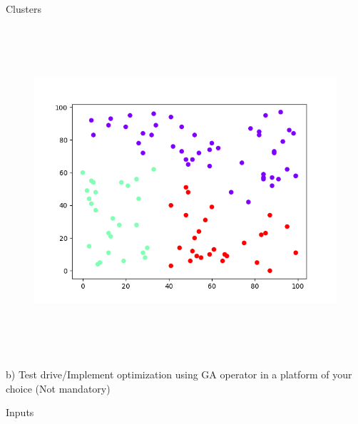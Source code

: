 \documentclass[12pt]{article}
\renewcommand{\_}{\kern-1.5pt\textunderscore\kern-1.5pt}
\begin{document}

\par

{\fontsize{14pt}{16.8pt} Clusters\par}\par




\begin{figure}[H]
	\begin{Center}
		\includegraphics[width=6.4in,height=4.8in]{./media/image20.png}
	\end{Center}
\end{figure}



\par


\vspace{\baselineskip}
{\fontsize{14pt}{16.8pt}\selectfont b) Test drive/Implement optimization using GA operator in a platform of your choice (Not mandatory)\par}\par

{\fontsize{14pt}{16.8pt}\selectfont Inputs\par}\par
\end{document}
